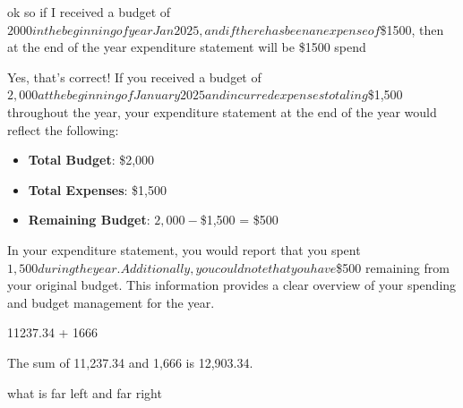 \begin{userprompt}

ok so if I received a budget of $2000 in the beginning of year Jan 2025, and if there has been an expense of $\$1500, then at the end of the year expenditure statement will be \$1500 spend

\end{userprompt}

\begin{botresponse}

Yes, that's correct! If you received a budget of $2,000 at the beginning of January 2025 and incurred expenses totaling $\$1,500 throughout the year, your expenditure statement at the end of the year would reflect the following:

\begin{itemize}
\item \textbf{Total Budget}: \$2,000
\item \textbf{Total Expenses}: \$1,500
\item \textbf{Remaining Budget}: $2,000 - $\$1,500 = \$500
\end{itemize}

In your expenditure statement, you would report that you spent $1,500 during the year. Additionally, you could note that you have $\$500 remaining from your original budget. This information provides a clear overview of your spending and budget management for the year.

\end{botresponse}

\begin{userprompt}

11237.34 + 1666

\end{userprompt}

\begin{botresponse}

The sum of 11,237.34 and 1,666 is 12,903.34.

\end{botresponse}

\begin{userprompt}

what is far left and far right

\end{userprompt}

